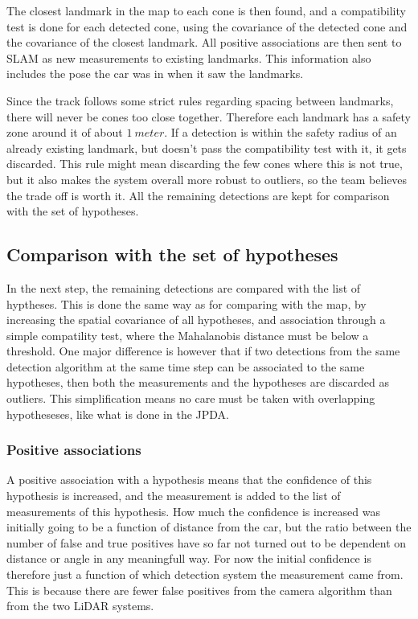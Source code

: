 The closest landmark in the map to each cone is then found, and a compatibility test is done for each detected cone, using the covariance of the detected cone and the covariance of the closest landmark. All positive associations are then sent to SLAM as new measurements to existing landmarks. This information also includes the pose the car was in when it saw the landmarks. 

Since the track follows some strict rules regarding spacing between landmarks, there will never be  cones too close together. Therefore each landmark has a safety zone around it of about $\SI{1}{meter}$. If a detection is within the safety radius of an already existing landmark, but doesn't pass the compatibility test with it, it gets discarded. This rule might mean discarding the few cones where this is not true, but it also makes the system overall more robust to outliers, so the team believes the trade off is worth it.  All the remaining detections are kept for comparison with the set of hypotheses. 

\subsection{Comparison with the set of hypotheses}

In the next step, the remaining detections are compared with the list of hyptheses. This is done the same way as for comparing with the map, by increasing the spatial covariance of all hypotheses, and association through a simple compatility test, where the Mahalanobis distance must be below a threshold. One major difference is however that if two detections from the same detection algorithm at the same time step can be associated to the same hypotheses, then both the measurements and the hypotheses are discarded as outliers. This simplification means no care must be taken with overlapping hypotheseses, like what is done in the JPDA. 

\subsubsection{Positive associations}

A positive association with a hypothesis means that the confidence of this hypothesis is increased, and the measurement is added to the list of measurements of this hypothesis. How much the confidence is increased was initially going to be a function of distance from the car, but the ratio between the number of false and true positives have so far not turned out to be dependent on distance or angle in any meaningfull way. For now the initial confidence is therefore just a function of which detection system the measurement came from. This is because there are fewer false positives from the camera algorithm than from the two LiDAR systems. 

